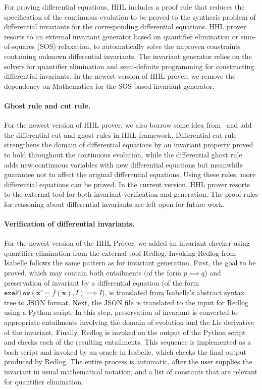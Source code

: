 \documentclass[runningheads,a4paper]{llncs}
\begin{document}
For proving differential equations, HHL includes a proof rule that reduces the specification of the continuous evolution to be proved to the synthesis problem of differential invariants for the corresponding differential equations. HHL prover resorts to an external invariant generator based on quantifier elimination or sum-of-squares (SOS) relaxation, to automatically solve the unproven constraints containing unknown differential invariants. The invariant generator relies on the solvers for quantifier elimination and semi-definite programming for constructing differential invariants. In the newest version of HHL prover, we remove the dependency on Mathematica for the SOS-based invariant generator.

\paragraph{Ghost rule and cut rule.}

For the newest version of HHL prover, we also borrow some idea from~\cite{Platzer18} and add the differential cut and ghost rules in HHL framework. Differential cut rule strengthens the domain of differential equations by an invariant property proved to hold throughout the continuous evolution, while the differential ghost rule adds new continuous variables with new differential equations but meanwhile guarantee not to affect the original differential equations. Using these rules, more differential equations can be proved.  In the current version, HHL prover resorts to the external tool for both invariant verification and generation. The proof rules for reasoning about differential invariants are left open for future work.

\paragraph{Verification of differential invariants.}

For the newest version of the HHL Prover, we added an invariant
checker using quantifier elimination from the external tool
Redlog. Invoking Redlog from Isabelle follows the same pattern as for
invariant generation. First, the goal to be proved, which may contain
both entailments (of the form $p\implies q$) and preservation of
invariant by a differential equation (of the form
$\mathtt{exeFlow}(\mathbf{x'}=f(\mathbf{x}),I)\implies I$), is
translated from Isabelle's abstract syntax tree to JSON format. Next,
the JSON file is translated to the input for Redlog using a Python
script. In this step, preservation of invariant is converted to
appropriate entailments involving the domain of evolution and the Lie
derivative of the invariant. Finally, Redlog is invoked on the output
of the Python script and checks each of the resulting
entailments. This sequence is implemented as a bash script and invoked
by an oracle in Isabelle, which checks the final output produced by
Redlog. The entire process is automatic, after the user supplies the
invariant in usual mathematical notation, and a list of constants that
are relevant for quantifier elimination.
\end{document}
